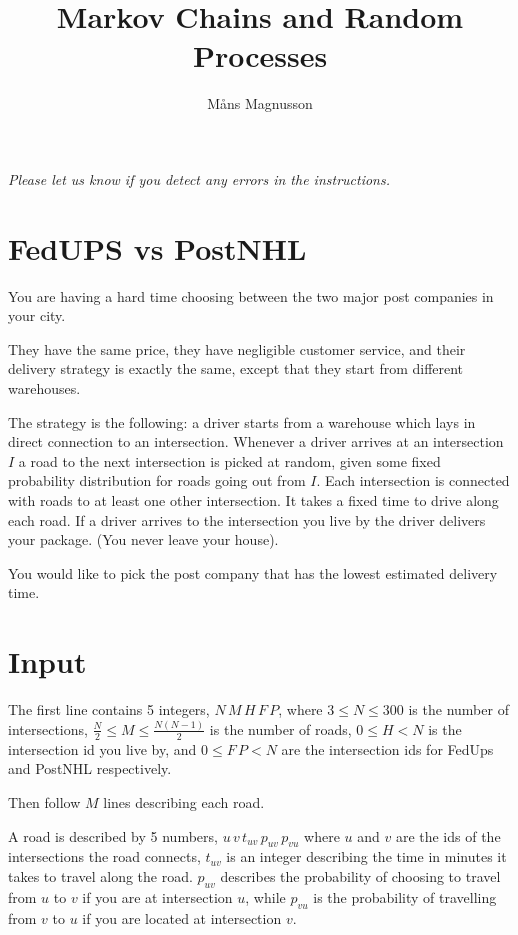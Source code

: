 \documentclass{tufte-handout}
\title{\sf Markov Chains and Random Processes}
\date{}
\author{M\aa ns Magnusson}
\begin{document}
\maketitle

\emph{Please 
let us know if you detect any errors in the instructions.}

\section{FedUPS vs PostNHL}

You are having a hard time choosing between the two major post companies in your city.

\medskip

They have the same price, they have negligible customer service, 
and their delivery strategy is exactly the same, except that they start from different warehouses.

The strategy is the following: a driver starts from a warehouse which lays in direct connection to an intersection. 
Whenever a driver arrives at an intersection $I$ a road to the next intersection is picked at random, given some fixed probability distribution for roads going out from $I$. 
Each intersection is connected with roads to at least one other intersection. It takes a fixed time to drive along each road. 
If a driver arrives to the intersection you live by the driver delivers your package. (You never leave your house).

\medskip

You would like to pick the post company that has the lowest estimated delivery time.


\section*{Input}
The first line contains 5 integers, $N\, M\, H\, F\, P$, where $3 \leq N \leq 300$ is the number of intersections, 
$\frac{N}{2} \leq M \leq \frac{N(N-1)}{2}$ is the number of roads, $0 \leq H < N$ is the intersection id you live by, and 
$0 \leq F\, P < N$ are the intersection ids for FedUps and PostNHL respectively. 

\medskip

Then follow $M$ lines describing each road.

\medskip

A road is described by 5 numbers, $u\, v\, t_{uv}\, p_{uv} \, p_{vu}$ where $u$ and $v$ are the ids of the intersections the road connects, 
$t_{uv}$ is an integer describing the time in minutes it takes to travel along the road. 
$p_{uv}$ describes the probability of choosing to travel from $u$ to $v$ if you are at intersection $u$, 
while $p_{vu}$ is the probability of travelling from $v$ to $u$ if you are located at intersection $v$.
\end{document}
